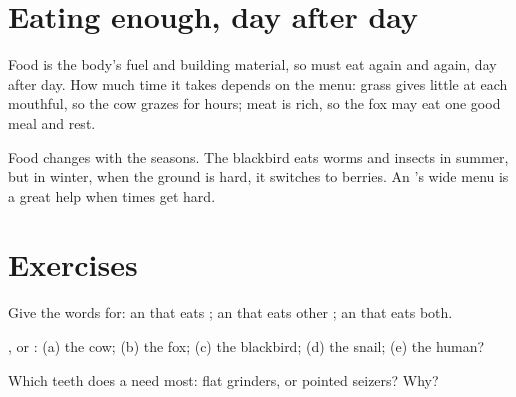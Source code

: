 \section{Eating enough, day after day}

\begin{proposition}\label{prop:g2:what-animals-eat:daily}
Food is the body's fuel and building material, so  must eat
again and again, day after day. How much time it takes depends on
the menu: grass gives little at each mouthful, so the cow grazes
for hours; meat is rich, so the fox may eat one good meal and rest.
\end{proposition}
\admitted

\begin{example}\label{ex:g2:what-animals-eat:winter}
Food changes with the seasons. The blackbird eats worms and
insects in summer, but in winter, when the ground is hard, it
switches to berries. An 's wide menu is a great help when
times get hard.
\end{example}

\section{Exercises}

\begin{exercise}[$\star$]\label{exo:g2:what-animals-eat:1}
Give the words for: an  that eats ; an  that
eats other ; an  that eats both.
\end{exercise}

\begin{exercise}[$\star$]\label{exo:g2:what-animals-eat:2}
,  or : (a) the cow; (b) the fox; (c)
the blackbird; (d) the snail; (e) the human?
\end{exercise}

\begin{exercise}[$\star$]\label{exo:g2:what-animals-eat:3}
Which teeth does a  need most: flat grinders, or pointed
seizers? Why?
\end{exercise}

